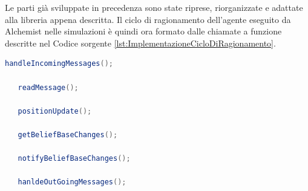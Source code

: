 \documentclass[12pt,a4paper,openright,twoside]{report}
\begin{document}
\bigskip

Le parti gi\`a sviluppate in precedenza sono state riprese, riorganizzate e adattate alla libreria appena descritta.
Il ciclo di ragionamento dell'agente eseguito da Alchemist nelle simulazioni \`e quindi ora formato dalle chiamate a funzione descritte nel Codice sorgente \ref{lst:ImplementazioneCicloDiRagionamento}.
\medskip
\begin{lstlisting}[language=Java,firstnumber=1,label={lst:ImplementazioneCicloDiRagionamento},caption={Implementazione ciclo di ragionamento}]
   handleIncomingMessages();

   readMessage();

   positionUpdate();

   getBeliefBaseChanges();

   notifyBeliefBaseChanges();

   hanldeOutGoingMessages();
\end{lstlisting}
\end{document}
